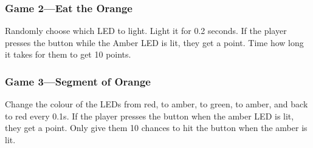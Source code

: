 \subsubsection*{Game 2---Eat the Orange}

Randomly choose which LED to light.  Light it for 0.2 seconds.  If the player presses the button while the Amber LED is lit, they get a point.  Time how long it takes for them to get 10 points.

\subsubsection*{Game 3---Segment of Orange}

Change the colour of the LEDs from red, to amber, to green, to amber, and back to red every 0.1s.  If the player presses the button when the amber LED is lit, they get a point.  Only give them 10 chances to hit the button when the amber is lit.
